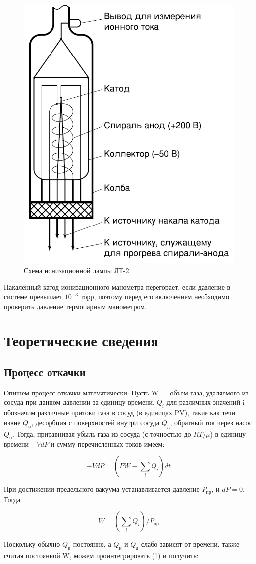 \documentclass[a4paper,12pt]{article} %
\begin{document}
\begin{figure}[!h]
 	\centering
 	\includegraphics[width=0.3\linewidth]{лампа.png}
 	\caption[]{Схема ионизационной лампы ЛТ-2}
 	
 \end{figure}

\medskip

\noindent Накалённый катод ионизационного манометра перегорает, если давление в системе превышает $10^{-3}$ торр, поэтому перед его включением необходимо проверить давление термопарным манометром.
\medskip

\section{Теоретические сведения}

 \subsection*{Процесс откачки}
\noindent Опишем процесс откачки математически: 
Пусть W --- объем газа, удаляемого из сосуда при данном давлении за единицу времени, $Q_i$ для различных значений i обозначим различные притоки газа в сосуд (в единицах PV), такие как течи извне $Q_\text{и}$, десорбция с поверхностей внутри сосуда $Q_\text{д}$, обратный ток через насос $Q_\text{н}$. Тогда, приравнивая убыль газа из сосуда (с точностью до $RT/\mu$) в единицу времени $-VdP$ и сумму перечисленных токов имеем:

 \begin{equation}
 	-VdP = (PW - \sum_i Q_i)dt
 \end{equation}
 
\noindent При достижении предельного вакуума устанавливается давление $P_{\text{пр}}$, и $dP = 0$. Тогда
 
 \begin{equation}
 	 W = ( \sum_i Q_i )/P_{\text{пр}}
 \end{equation}
 
\noindent Поскольку обычно $Q_\text{и}$ постоянно, а $Q_\text{н}$ и $Q_\text{д}$ слабо зависят от времени, также считая постоянной W, можем проинтегрировать (1) и получить:
 
\end{document}
